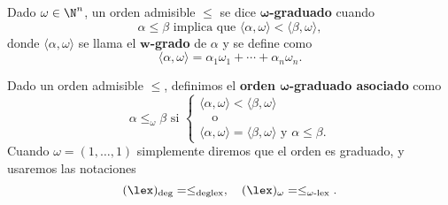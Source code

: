 
\begin{definicion}
    Dado $\omega\in \N^n$, un orden admisible $\le$ se dice \textbf{$\boldsymbol{\omega}$-graduado} cuando
    \begin{equation*}
        \alpha\le \beta \text { implica que } \langle \alpha, \omega\rangle  < \langle \beta, \omega\rangle,
    \end{equation*}
    donde $\langle \alpha, \omega\rangle$ se llama el \textbf{$\boldsymbol{w}$-grado} de $\alpha$ y se define como
    \begin{equation}
        \langle \alpha, \omega\rangle = \alpha_1 \omega_1 + \cdots + \alpha_n \omega_n.
    \end{equation}
\end{definicion}

\begin{definicion}
    Dado un orden admisible $\le$, definimos el \textbf{orden $\boldsymbol{\omega}$-graduado asociado} como
    \begin{equation*}
        \alpha \le_{\omega} \beta \text{ si } \begin{cases}
            \langle \alpha, \omega\rangle  < \langle \beta, \omega\rangle \\
            \quad\text{o}   \\
           \langle \alpha, \omega\rangle = \langle \beta, \omega\rangle \text{ y } \alpha \le \beta.
        \end{cases}
    \end{equation*}
    Cuando $\omega = (1,\dots, 1)$ simplemente diremos que el orden es graduado, y usaremos las notaciones
    \begin{equation*}
       (\lex)_{\text{deg}} = \le_{\text{deglex}},\quad (\lex)_{\omega} = \le_{\omega\text{-lex}}.
    \end{equation*}
\end{definicion}

